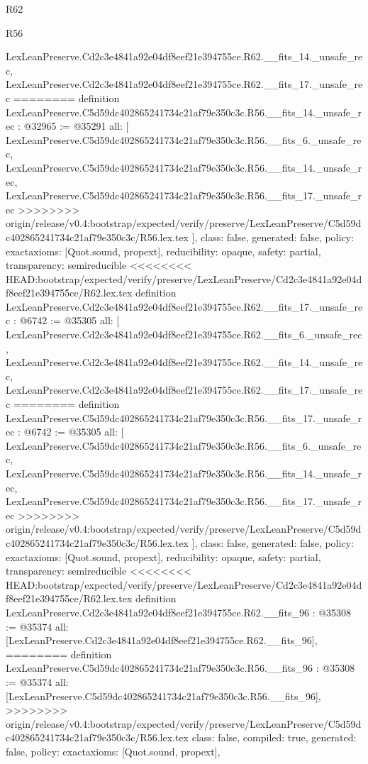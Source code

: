 \begin{lexlean}{R62}
\begin{lexlean}{R56}
\begin{coremodule}
{{{{{{{{{{{{{{{{{{{{{{{{{{{{{{{{{{{{{{{{{{{{{{{{{{{{{{{{{{{{{{{{{{{{{{{{{{{{{{{{{{{{{{{{{{{{{{{{{{{{{{{{{{{{{{{{{{{{{{{{{{{{{{{{{{{{{{{{{{{{{{{{{{{{{{{{{{{{{{{{{{    LexLeanPreserve.Cd2c3e4841a92e04df8eef21e394755ce.R62.__fits_14._unsafe_rec,
    LexLeanPreserve.Cd2c3e4841a92e04df8eef21e394755ce.R62.__fits_17._unsafe_rec
========
definition LexLeanPreserve.C5d59dc402865241734c21af79e350c3c.R56.__fits_14._unsafe_rec : @32965 := @35291 {
  all: [
    LexLeanPreserve.C5d59dc402865241734c21af79e350c3c.R56.__fits_6._unsafe_rec,
    LexLeanPreserve.C5d59dc402865241734c21af79e350c3c.R56.__fits_14._unsafe_rec,
    LexLeanPreserve.C5d59dc402865241734c21af79e350c3c.R56.__fits_17._unsafe_rec
>>>>>>>> origin/release/v0.4:bootstrap/expected/verify/preserve/LexLeanPreserve/C5d59dc402865241734c21af79e350c3c/R56.lex.tex
  ],
  class: false,
  generated: false,
  policy: exact{axioms: [Quot.sound, propext]},
  reducibility: opaque{},
  safety: partial,
  transparency: semireducible
}
<<<<<<<< HEAD:bootstrap/expected/verify/preserve/LexLeanPreserve/Cd2c3e4841a92e04df8eef21e394755ce/R62.lex.tex
definition LexLeanPreserve.Cd2c3e4841a92e04df8eef21e394755ce.R62.__fits_17._unsafe_rec : @6742 := @35305 {
  all: [
    LexLeanPreserve.Cd2c3e4841a92e04df8eef21e394755ce.R62.__fits_6._unsafe_rec,
    LexLeanPreserve.Cd2c3e4841a92e04df8eef21e394755ce.R62.__fits_14._unsafe_rec,
    LexLeanPreserve.Cd2c3e4841a92e04df8eef21e394755ce.R62.__fits_17._unsafe_rec
========
definition LexLeanPreserve.C5d59dc402865241734c21af79e350c3c.R56.__fits_17._unsafe_rec : @6742 := @35305 {
  all: [
    LexLeanPreserve.C5d59dc402865241734c21af79e350c3c.R56.__fits_6._unsafe_rec,
    LexLeanPreserve.C5d59dc402865241734c21af79e350c3c.R56.__fits_14._unsafe_rec,
    LexLeanPreserve.C5d59dc402865241734c21af79e350c3c.R56.__fits_17._unsafe_rec
>>>>>>>> origin/release/v0.4:bootstrap/expected/verify/preserve/LexLeanPreserve/C5d59dc402865241734c21af79e350c3c/R56.lex.tex
  ],
  class: false,
  generated: false,
  policy: exact{axioms: [Quot.sound, propext]},
  reducibility: opaque{},
  safety: partial,
  transparency: semireducible
}
<<<<<<<< HEAD:bootstrap/expected/verify/preserve/LexLeanPreserve/Cd2c3e4841a92e04df8eef21e394755ce/R62.lex.tex
definition LexLeanPreserve.Cd2c3e4841a92e04df8eef21e394755ce.R62.__fits_96 : @35308 := @35374 {
  all: [LexLeanPreserve.Cd2c3e4841a92e04df8eef21e394755ce.R62.__fits_96],
========
definition LexLeanPreserve.C5d59dc402865241734c21af79e350c3c.R56.__fits_96 : @35308 := @35374 {
  all: [LexLeanPreserve.C5d59dc402865241734c21af79e350c3c.R56.__fits_96],
>>>>>>>> origin/release/v0.4:bootstrap/expected/verify/preserve/LexLeanPreserve/C5d59dc402865241734c21af79e350c3c/R56.lex.tex
  class: false,
  compiled: true,
  generated: false,
  policy: exact{axioms: [Quot.sound, propext]},
}}}}}}}}}}}}}}}}}}}}}}}}}}}}}}}}}}}}}}}}}}}}}}}}}}}}}}}}}}}}}}}}}}}}}}}}}}}}}}}}}}}}}}}}}}}}}}}}}}}}}}}}}}}}}}}}}}}}}}}}}}}}}}}}}}}}}}}}}}}}}}}}}}}}}}}}}}}}}}}}}}}}}
\end{coremodule}
\end{lexlean}
\end{lexlean}
